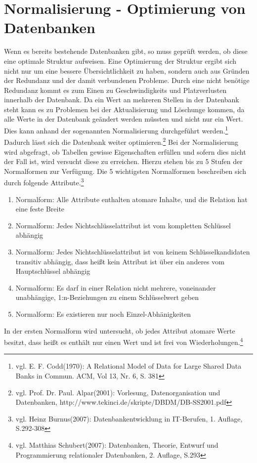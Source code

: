 \section{Normalisierung - Optimierung von Datenbanken}
\label{secNormalisierung}
Wenn es bereits bestehende Datenbanken gibt, so muss geprüft werden, ob diese eine optimale Struktur aufweisen.
Eine Optimierung der Struktur ergibt sich nicht nur um eine bessere Übersichtlichkeit zu haben, sondern auch aus Gründen der Redundanz und der damit verbundenen Probleme.
Durch eine nicht benötige Redundanz kommt es zum Einen zu Geschwindigkeits und Platzverlusten innerhalb der Datenbank.
Da ein Wert an mehreren Stellen in der Datenbank steht kann es zu Problemen bei der Aktualisierung und Löschunge kommen, da alle Werte in der Datenbank geändert werden müssten und nicht nur ein Wert.
Dies kann anhand der sogenannten Normalisierung durchgeführt werden.\footnote{vgl. E. F. Codd(1970): A Relational Model of Data for Large Shared Data Banks in Commun. ACM, Vol 13, Nr. 6, S. 381} Dadurch lässt sich die Datenbank weiter optimieren.\footnote{vgl. Prof. Dr. Paul. Alpar(2001): Vorlesung, Datenorganisation und Datenbanken,  http://www.tekinci.de/skripte/DBDM/DB-SS2001.pdf}
Bei der Normalisierung wird abgefragt, ob Tabellen gewisse Eigenschaften erfüllen und sofern dies nicht der Fall ist, wird versucht diese zu erreichen.
Hierzu stehen bis zu 5 Stufen der Normalformen zur Verfügung.
Die 5 wichtigsten Normalformen beschreiben sich durch folgende Attribute.\footnote{vgl. Heinz Burnus(2007): Datenbankentwicklung in IT-Berufen, 1. Auflage, S.292-308}

\begin{enumerate}
\item Normalform: Alle Attribute enthalten atomare Inhalte, und die Relation hat eine feste Breite
\item Normalform: Jedes Nichtschlüsselattribut ist vom kompletten Schlüssel abhängig
\item Normalform: Jedes Nichtschlüsselattribut ist von keinem Schlüsselkandidaten transitiv abhängig, dass heißt kein Attribut ist über ein anderes vom Hauptschlüssel abhängig
\item Normalform: Es darf in einer Relation nicht mehrere, voneinander unabhängige, 1:n-Beziehungen zu einem Schlüsselwert geben
\item Normalform: Es existieren nur noch Einzel-Abhänigkeiten
\end{enumerate}


In der ersten Normalform wird untersucht, ob jedes Attribut atomare Werte besitzt, dass heißt es enthält nur einen Wert und ist frei von Wiederholungen.\footnote{vgl. Matthias Schubert(2007): Datenbanken, Theorie, Entwurf und Programmierung relationaler Datenbanken, 2. Auflage, S.293}


